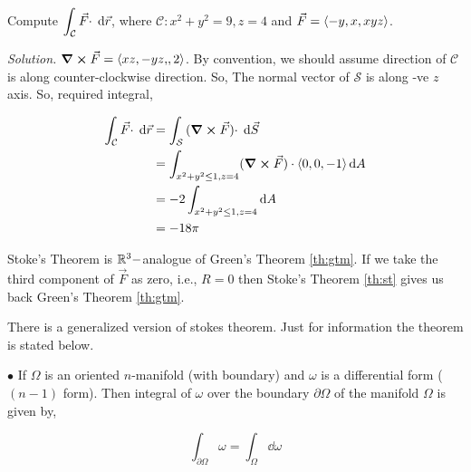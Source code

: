 \documentclass[../Analysis-3.tex]{subfiles}
\begin{document}
\begin{Eg}{}{}
  Compute $\displaystyle\int_{\mathcal{C}} {\vec{F} \cdot } \hspace{0.1cm} \dd {\vec{r}}$, where $\mathcal{C} : x^2 +y^2 = 9, z =4$ and $\vec{F} = \left\langle {-y,x}, {xyz} \right\rangle$.

  \textit{Solution.} $\curl \vec{F} = \left\langle {xz,-yz,}, {2} \right\rangle$. By convention, we should assume direction of $\mathcal{C}$ is along counter-clockwise direction. So,  The normal vector of $\mathcal{S}$ is along -ve $z$ axis. So, required integral,

  \begin{align*}
    \int_{\mathcal{C}} {\vec{F} \cdot } \hspace{0.1cm} \dd {\vec{r}} & = \int_{\mathcal{S}} {(\curl \vec{F}) \cdot} \hspace{0.1cm} \dd {\vec{S}}                     \\
                                                & = \int_{x^2+y^2 \le 1, z =4 } (\curl \vec{F}) \cdot \left\langle {0,0}, {-1} \right\rangle \dd{A} \\
                                                & = -2 \int_{x^2+y^2 \le 1, z =4} \dd{A}                                   \\
                                                & = -18\pi
  \end{align*}

\end{Eg}


Stoke's Theorem is $\mathbb{R}^3-$analogue of Green's Theorem \ref{th:gtm}. If we take the third component of $\vec{F}$ as zero, i.e., $R = 0$ then Stoke's Theorem \ref{th:st} gives us back Green's Theorem \ref{th:gtm}.

\begin{tcolorbox}
  There is a generalized version of stokes theorem. Just for information the theorem is stated below.

  $\bullet$ If $\Omega$ is an oriented $n$-manifold (with boundary) and $\omega$ is a differential form ($(n-1)$ form). Then integral of $\omega$ over the boundary $\partial \Omega$ of the manifold $\Omega$ is given by,

  \[\int_{\partial \Omega} \omega = \int_{\Omega} \dd \omega\]

\end{tcolorbox}
\end{document}
